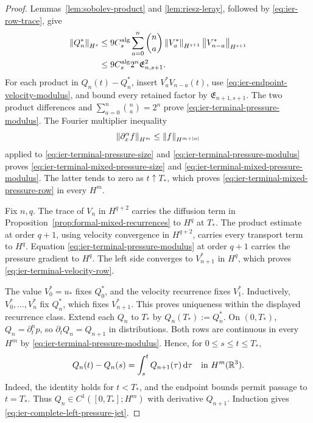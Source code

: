 \begin{proof}
Lemmas~\ref{lem:sobolev-product} and \ref{lem:riesz-leray}, followed by
\eqref{eq:ier-row-trace}, give
\begin{align*}
 \left\lVert Q_n^*\right\rVert_{H^s}
 &\le9C_s^{\rm alg}\sum_{a=0}^{n}\binom na
 \left\lVert V_a^*\right\rVert_{H^{s+1}}\left\lVert V_{n-a}^*\right\rVert_{H^{s+1}}\\
 &\le9C_s^{\rm alg}2^n\mathfrak E_{n,s+1}^2.
\end{align*}
For each product in \(Q_n(t)-Q_n^*\), insert
\(V_a^*V_{n-a}(t)\), use
\eqref{eq:ier-endpoint-velocity-modulus}, and bound every retained factor by
\(\mathfrak E_{n+1,s+1}\).  The two product differences and
\(\sum_{a=0}^{n}\binom na=2^n\) prove
\eqref{eq:ier-terminal-pressure-modulus}.  The Fourier multiplier inequality
\[
 \left\lVert \partial_x^\alpha f\right\rVert_{H^m}
 \le\left\lVert f\right\rVert_{H^{m+|\alpha|}}
\]
applied to \eqref{eq:ier-terminal-pressure-size} and
\eqref{eq:ier-terminal-pressure-modulus} proves
\eqref{eq:ier-terminal-mixed-pressure-size} and
\eqref{eq:ier-terminal-mixed-pressure-modulus}.  The latter tends to zero
as \(t\uparrow T_*\), which proves
\eqref{eq:ier-terminal-mixed-pressure-row} in every \(H^m\).

Fix \(n,q\).  The trace of \(V_n\) in \(H^{q+2}\) carries the diffusion
term in Proposition~\ref{prop:formal-mixed-recurrences} to \(H^q\) at
\(T_*\).  The product estimate at order \(q+1\), using velocity convergence
in \(H^{q+2}\), carries every transport term to \(H^q\).  Equation
\eqref{eq:ier-terminal-pressure-modulus} at order \(q+1\) carries the pressure
gradient to \(H^q\).  The left side converges to \(V_{n+1}^*\) in \(H^q\),
which proves \eqref{eq:ier-terminal-velocity-row}.

The value \(V_0^*=u_*\) fixes \(Q_0^*\), and the velocity recurrence fixes
\(V_1^*\).  Inductively, \(V_0^*,\ldots,V_n^*\) fix \(Q_n^*\), which fixes
\(V_{n+1}^*\).  This proves uniqueness within the displayed recurrence
class.  Extend each \(Q_n\) to \(T_*\) by
\(Q_n(T_*):=Q_n^*\).  On \((0,T_*)\),
\(Q_n=\partial_t^np\), so \(\partial_tQ_n=Q_{n+1}\) in distributions.
Both rows are continuous in every \(H^m\) by
\eqref{eq:ier-terminal-pressure-modulus}.  Hence, for
\(0\le s\le t\le T_*\),
\begin{equation}
 Q_n(t)-Q_n(s)=\int_s^tQ_{n+1}(\tau)\,\mathrm d\tau
 \quad\text{in }H^m(\mathbb R^3).
 \label{eq:ier-pressure-banach-identity}
\end{equation}
Indeed, the identity holds for \(t<T_*\), and the endpoint bounds permit
passage to \(t=T_*\).  Thus
\(Q_n\in C^1([0,T_*];H^m)\) with derivative \(Q_{n+1}\).  Induction gives
\eqref{eq:ier-complete-left-pressure-jet}.
\end{proof}

